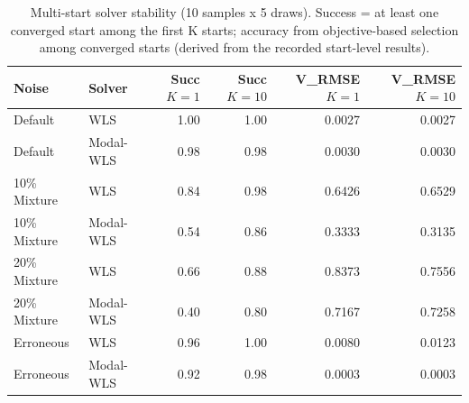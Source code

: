 \begin{table}[htbp]
\centering
\caption{Multi-start solver stability (10 samples x 5 draws). Success = at least one converged start among the first K starts; accuracy from objective-based selection among converged starts (derived from the recorded start-level results).}
\label{tab:multistart}
\footnotesize
\begin{tabular}{llrrrr}
\toprule
Noise & Solver & Succ $K{=}1$ & Succ $K{=}10$ & V\_RMSE $K{=}1$ & V\_RMSE $K{=}10$ \\
\midrule
Default & WLS & 1.00 & 1.00 & 0.0027 & 0.0027 \\
Default & Modal-WLS & 0.98 & 0.98 & 0.0030 & 0.0030 \\
10\% Mixture & WLS & 0.84 & 0.98 & 0.6426 & 0.6529 \\
10\% Mixture & Modal-WLS & 0.54 & 0.86 & 0.3333 & 0.3135 \\
20\% Mixture & WLS & 0.66 & 0.88 & 0.8373 & 0.7556 \\
20\% Mixture & Modal-WLS & 0.40 & 0.80 & 0.7167 & 0.7258 \\
Erroneous & WLS & 0.96 & 1.00 & 0.0080 & 0.0123 \\
Erroneous & Modal-WLS & 0.92 & 0.98 & 0.0003 & 0.0003 \\
\bottomrule
\end{tabular}
\end{table}
